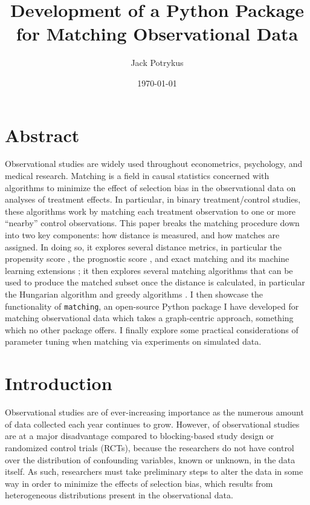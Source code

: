 \documentclass[11pt]{extarticle}
\title{Development of a Python Package for Matching Observational Data}
\author{Jack Potrykus}
\date{\today}
\begin{document}
\maketitle{}

\section*{Abstract}
\label{sec:abstract}

Observational studies are widely used throughout econometrics, psychology, and medical research.
Matching is a field in causal statistics concerned with algorithms to minimize the effect of selection bias in the observational data on analyses of treatment effects.
In particular, in binary treatment/control studies, these algorithms work by matching each treatment observation to one or more ``nearby'' control observations.
This paper breaks the matching procedure down into two key components: how distance is measured, and how matches are assigned.
In doing so, it explores several distance metrics, in particular the propensity score \parencite{rosenbaum_central_1983}, the prognostic score \parencite{hansen_prognostic_2008}, and exact matching \parencite{iacus_causal_2012} and its machine learning extensions \parencite{liu_interpretable_2019, wang_flame_2021}; it then explores several matching algorithms that can be used to produce the matched subset once the distance is calculated, in particular the Hungarian algorithm \parencite{munkres_algorithms_1957} and greedy algorithms \parencite{ho_matchit_2011}.
I then showcase the functionality of \texttt{matching}, an open-source Python package I have developed for matching observational data which takes a graph-centric approach, something which no other package offers.
I finally explore some practical considerations of parameter tuning when matching via experiments on simulated data.

\newpage{}
\tableofcontents{}
\newpage{}


\section{Introduction}
\label{sec:intro}

Observational studies are of ever-increasing importance as the numerous amount of data collected each year continues to grow.
However, of observational studies are at a major disadvantage compared to blocking-based study design or randomized control trials (RCTs), because the researchers do not have control over the distribution of confounding variables, known or unknown, in the data itself. As such, researchers must take preliminary steps to alter the data in some way in order to minimize the effects of selection bias, which results from heterogeneous distributions present in the observational data.
\end{document}
